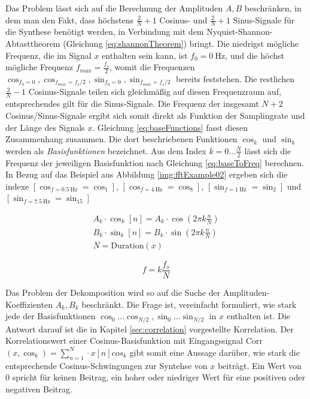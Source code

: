Das Problem lässt sich auf die Berechnung der Amplituden $A,B$ beschränken, in dem man den Fakt, dass höchstens $\frac{2}{N} + 1$ Cosinus- und $\frac{2}{N} + 1$ Sinus-Signale für die Synthese benötigt werden, in Verbindung mit dem Nyquist-Shannon-Abtasttheorem (Gleichung \ref{eq:shannonTheorem}) bringt. Die niedrigst mögliche Frequenz, die im Signal $x$ enthalten sein kann, ist $f_0 = \SI{0}{\hertz}$, und die höchst mögliche Frequenz $f_{max} = \frac{f_s}{2}$, womit die Frequenzen $\cos_{f_0 = 0} , \cos_{f_{max} = f_s/2},\sin_{f_0 = 0} , \sin_{f_{max} = f_s/2}$ bereits feststehen. Die restlichen $\frac{2}{N} - 1$ Cosinus-Signale teilen sich gleichmäßig auf diesen Frequenzraum auf, entsprechendes gilt für die Sinus-Signale. Die Frequenz der insgesamt $N+2$ Cosinus/Sinus-Signale ergibt sich somit direkt als Funktion der Samplingrate und der Länge des Signals $x$. Gleichung \ref{eq:baseFunctions} fasst diesen Zusammenhang zusammen. Die dort beschriebenen Funktionen $\cos_k$ und $\sin_k$werden als \emph{Basisfunktionen} bezeichnet. Aus dem  Index $k = 0 ... \frac{N}{2}$ lässt sich die Frequenz der jeweiligen Basisfunktion nach Gleichung \ref{eq:baseToFreq} berechnen.\cite[140 - 151, S.]{dspGuide}  In Bezug auf das Beispiel aus Abbildung \ref{img:fftExample02} ergeben sich die indexe $[\cos_{f=\SI{0.5}{\hertz}} = \cos_1]$, $[\cos_{f=\SI{4}{\hertz}} = \cos_8]$, $[\sin_{f=\SI{1}{\hertz}} = \sin_2]$ und $[\sin_{f=\SI{7.5}{\hertz}} = \sin_{15}]$

\begin{equation}
\label{eq:baseFunctions}
\begin{split}
A_k \cdot \cos_k[n] = A_k\cdot \cos(2\pi k \frac{n}{N}) \\
B_k \cdot \sin_k[n] = B_k \cdot \sin(2\pi k \frac{n}{N}) \\
N = \text{Duration} (x)
\end{split}
\end{equation} 

\begin{equation}
\label{eq:baseToFreq}
f = k\frac{f_s}{N} 
\end{equation} 

Das Problem der Dekomposition wird so auf die Suche der Amplituden-Koeffizienten $A_k, B_k$ beschränkt. Die Frage ist, vereinfacht formuliert, wie \glqq stark\grqq{} jede der Basisfunktionen $\cos_0 \ldots \cos_{N/2} , \sin_0 \ldots \sin_{N/2}$ in $x$ enthalten ist.  Die Antwort darauf ist die in Kapitel \ref{sec:correlation} vorgestellte Korrelation. Der Korrelationswert einer Cosinus-Basisfunktion mit Eingangssignal Corr$(x,\cos_k) = \sum_{n=1}^{N} \cdot x[n]cos_k$ gibt somit eine Aussage darüber, wie stark die entsprechende Cosinus-Schwingungen zur Syntehse von $x$ beiträgt. Ein Wert von $0$ spricht für keinen Beitrag, ein hoher oder niedriger Wert für eine positiven oder negativen Beitrag. \cite[S. 157 - 158]{dspGuide}

